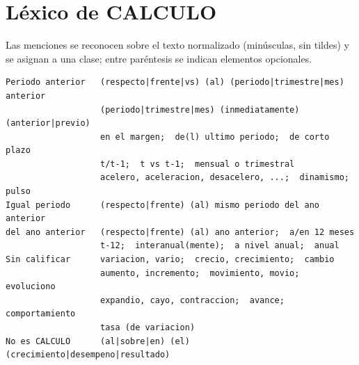 \documentclass[11pt]{article}
\begin{document}

\medskip



\appendix

\section{Léxico de CALCULO}
\label{app:lexico}

Las menciones se reconocen sobre el texto normalizado (minúsculas, sin tildes)
y se asignan a una clase; entre paréntesis se indican elementos opcionales.

\begin{verbatim}
Periodo anterior   (respecto|frente|vs) (al) (periodo|trimestre|mes) anterior
                   (periodo|trimestre|mes) (inmediatamente) (anterior|previo)
                   en el margen;  de(l) ultimo periodo;  de corto plazo
                   t/t-1;  t vs t-1;  mensual o trimestral
                   acelero, aceleracion, desacelero, ...;  dinamismo;  pulso
Igual periodo      (respecto|frente) (al) mismo periodo del ano anterior
del ano anterior   (respecto|frente) (al) ano anterior;  a/en 12 meses
                   t-12;  interanual(mente);  a nivel anual;  anual
Sin calificar      variacion, vario;  crecio, crecimiento;  cambio
                   aumento, incremento;  movimiento, movio;  evoluciono
                   expandio, cayo, contraccion;  avance;  comportamiento
                   tasa (de variacion)
No es CALCULO      (al|sobre|en) (el) (crecimiento|desempeno|resultado)
\end{verbatim}
\end{document}
